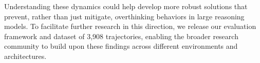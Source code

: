 Understanding these dynamics could help develop more robust solutions that prevent, rather than just mitigate, overthinking behaviors in large reasoning models. To facilitate further research in this direction, we release our evaluation framework and dataset of 3,908 trajectories, enabling the broader research community to build upon these findings across different environments and architectures.
